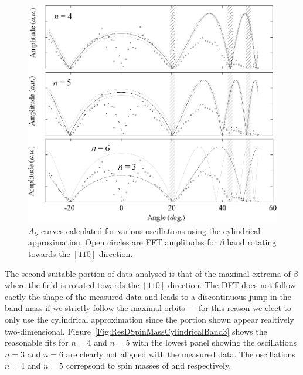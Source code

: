 \begin{figure}[htbp]
    \begin{center}
        \includegraphics[scale=0.75]{Chapter-dHvABaFe2P2/Figures/Mass/SpinMassBand3Cylindrical/SpinMassBand3Cylindrical_110}
        \caption{$A_S$ curves calculated for various oscillations using the cylindrical approximation. Open circles are \ac{FFT} amplitudes for $\beta$ band rotating towards the $[110]$ direction.}
        \label{Fig:ResD:SpinMassFromDFTBand4}
    \end{center}
\end{figure}
The second suitable portion of data analysed is that of the maximal extrema of $\beta$ where the field is rotated towards the $[110]$ direction. The \ac{DFT} does not follow eactly the shape of the measured data and leads to a discontinuous jump in the band mass if we strictly follow the maximal orbits --- for this reason we elect to only use the cylindrical approximation since the portion shown appear realtively two-dimensional. Figure~\ref{Fig:ResDSpinMassCylindricalBand3} shows the reasonable fits for $n=4$ and $n=5$ with the lowest panel showing the oscillations $n=3$ and $n=6$ are clearly not aligned with the measured data. The oscillations $n=4$ and $n=5$ correpsond to spin masses of  and  respectively.

